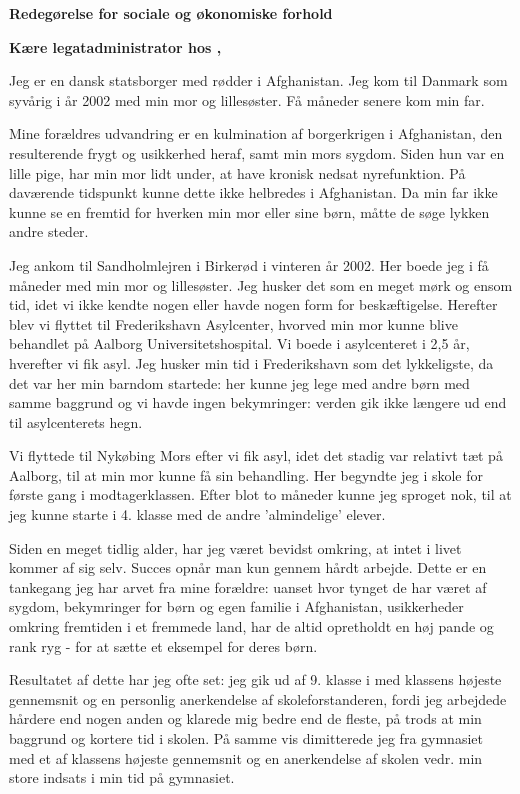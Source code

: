 \documentclass[../Ansoegning.tex]{subfiles}
\begin{document}
\par{\centering
		{\Large \textbf{Redegørelse for sociale og økonomiske forhold}} \par}

\textbf{Kære legatadministrator hos \textit{\FondNavn},}

Jeg er en dansk statsborger med rødder i Afghanistan. Jeg kom til Danmark som syvårig i år 2002 med min mor og lillesøster. Få måneder senere kom min far.

Mine forældres udvandring er en kulmination af borgerkrigen i Afghanistan, den resulterende
frygt og usikkerhed heraf, samt min mors sygdom. Siden hun var en lille pige, har min mor
lidt under, at have kronisk nedsat nyrefunktion. På daværende tidspunkt kunne dette ikke
helbredes i Afghanistan. Da min far ikke kunne se en fremtid for hverken min mor eller sine
børn, måtte de søge lykken andre steder.

Jeg ankom til Sandholmlejren i Birkerød i vinteren år 2002. Her boede jeg i få måneder
med min mor og lillesøster. Jeg husker det som en meget mørk og ensom tid, idet vi ikke
kendte nogen eller havde nogen form for beskæftigelse. Herefter blev vi flyttet til Frederikshavn
Asylcenter, hvorved min mor kunne blive behandlet på Aalborg Universitetshospital.
Vi boede i asylcenteret i 2,5 år, hverefter vi fik asyl. Jeg husker min tid i Frederikshavn som
det lykkeligste, da det var her min barndom startede: her kunne jeg lege med andre børn
med samme baggrund og vi havde ingen bekymringer: verden gik ikke længere ud end til
asylcenterets hegn.

Vi flyttede til Nykøbing Mors efter vi fik asyl, idet det stadig var relativt tæt på Aalborg, til at
min mor kunne få sin behandling. Her begyndte jeg i skole for første gang i modtagerklassen.
Efter blot to måneder kunne jeg sproget nok, til at jeg kunne starte i 4. klasse med de andre
’almindelige’ elever.

Siden en meget tidlig alder, har jeg været bevidst omkring, at intet i livet kommer af sig selv.
Succes opnår man kun gennem hårdt arbejde. Dette er en tankegang jeg har arvet fra mine
forældre: uanset hvor tynget de har været af sygdom, bekymringer for børn og egen familie
i Afghanistan, usikkerheder omkring fremtiden i et fremmede land, har de altid opretholdt
en høj pande og rank ryg - for at sætte et eksempel for deres børn.

Resultatet af dette har jeg ofte set: jeg gik ud af 9. klasse i med klassens højeste gennemsnit
og en personlig anerkendelse af skoleforstanderen, fordi jeg arbejdede hårdere end nogen
anden og klarede mig bedre end de fleste, på trods at min baggrund og kortere tid i skolen.
På samme vis dimitterede jeg fra gymnasiet med et af klassens højeste gennemsnit og en
anerkendelse af skolen vedr. min store indsats i min tid på gymnasiet.
\end{document}
